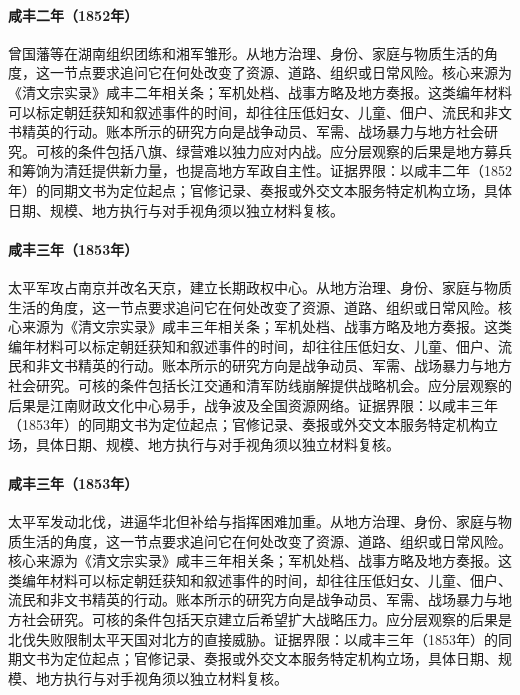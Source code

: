\hypertarget{social:EQ-1852-HUNAN-ARMY-ORIGINS}{}\paragraph{咸丰二年（1852年）}曾国藩等在湖南组织团练和湘军雏形。从地方治理、身份、家庭与物质生活的角度，这一节点要求追问它在何处改变了资源、道路、组织或日常风险。核心来源为《清文宗实录》咸丰二年相关条；军机处档、战事方略及地方奏报。这类编年材料可以标定朝廷获知和叙述事件的时间，却往往压低妇女、儿童、佃户、流民和非文书精英的行动。账本所示的研究方向是战争动员、军需、战场暴力与地方社会研究。可核的条件包括八旗、绿营难以独力应对内战。应分层观察的后果是地方募兵和筹饷为清廷提供新力量，也提高地方军政自主性。证据界限：以咸丰二年（1852年）的同期文书为定位起点；官修记录、奏报或外交文本服务特定机构立场，具体日期、规模、地方执行与对手视角须以独立材料复核。
\hypertarget{social:EQ-1853-NANJING-TAKING}{}\paragraph{咸丰三年（1853年）}太平军攻占南京并改名天京，建立长期政权中心。从地方治理、身份、家庭与物质生活的角度，这一节点要求追问它在何处改变了资源、道路、组织或日常风险。核心来源为《清文宗实录》咸丰三年相关条；军机处档、战事方略及地方奏报。这类编年材料可以标定朝廷获知和叙述事件的时间，却往往压低妇女、儿童、佃户、流民和非文书精英的行动。账本所示的研究方向是战争动员、军需、战场暴力与地方社会研究。可核的条件包括长江交通和清军防线崩解提供战略机会。应分层观察的后果是江南财政文化中心易手，战争波及全国资源网络。证据界限：以咸丰三年（1853年）的同期文书为定位起点；官修记录、奏报或外交文本服务特定机构立场，具体日期、规模、地方执行与对手视角须以独立材料复核。
\hypertarget{social:EQ-1853-NORTHERN-EXPEDITION}{}\paragraph{咸丰三年（1853年）}太平军发动北伐，进逼华北但补给与指挥困难加重。从地方治理、身份、家庭与物质生活的角度，这一节点要求追问它在何处改变了资源、道路、组织或日常风险。核心来源为《清文宗实录》咸丰三年相关条；军机处档、战事方略及地方奏报。这类编年材料可以标定朝廷获知和叙述事件的时间，却往往压低妇女、儿童、佃户、流民和非文书精英的行动。账本所示的研究方向是战争动员、军需、战场暴力与地方社会研究。可核的条件包括天京建立后希望扩大战略压力。应分层观察的后果是北伐失败限制太平天国对北方的直接威胁。证据界限：以咸丰三年（1853年）的同期文书为定位起点；官修记录、奏报或外交文本服务特定机构立场，具体日期、规模、地方执行与对手视角须以独立材料复核。
